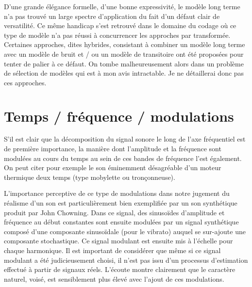 D'une grande élégance formelle, d'une bonne expressivité, le modèle long terme n'a pas trouvé un large spectre d'application du fait d'un défaut clair de versatilité. Ce même handicap s'est retrouvé dans le domaine du codage où ce type de modèle n'a pas réussi à concurrencer les approches par transformée.~\cite{den2002parametric} Certaines approches, dites hybrides, consistant à combiner un modèle long terme avec un modèle de bruit et / ou un modèle de transitoire ont été proposées pour tenter de palier à ce défaut. On tombe malheureusement alors dans un problème de sélection de modèles qui est à mon avis intractable. Je ne détaillerai donc pas ces approches.


\section{ \nmu Temps / fréquence / modulations}  \label{sec:tfm}

S'il est clair que la décomposition du signal sonore le long de l'axe fréquentiel est de première importance, la manière dont l'amplitude et la fréquence sont modulées au cours du temps au sein de ces bandes de fréquence l'est également. On peut citer pour exemple le son éminemment désagréable d'un moteur thermique deux temps (type mobylette ou tronçonneuse).


L'importance perceptive de ce type de modulations dans notre jugement du réalisme d'un son  est particulièrement bien exemplifiée par un son synthétique produit par John Chowning. Dans ce signal, des sinusoïdes d'amplitude et fréquence au début constantes sont ensuite modulées par un signal synthétique composé d'une composante sinusoïdale (pour le vibrato) auquel se sur-ajoute une composante stochastique. Ce signal modulant est ensuite mis à l'échelle pour chaque harmonique. Il est important de considérer que même si ce signal modulant a été judicieusement choisi, il n'est pas issu d'un processus d'estimation effectué à partir de signaux réels. L'écoute montre clairement que le caractère naturel, voisé, est sensiblement plus élevé avec l'ajout de ces modulations.

